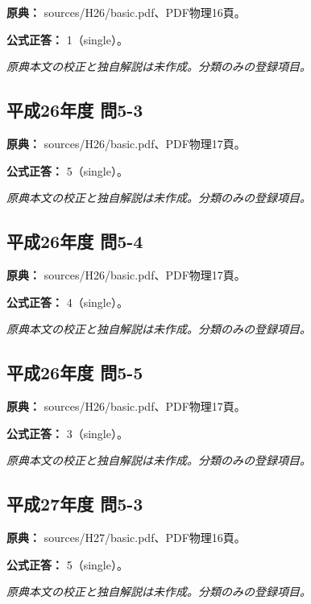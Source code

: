 \noindent\textbf{原典：} sources/H26/basic.pdf、PDF物理16頁。

\textbf{公式正答：} 1（single）。

\par\textit{原典本文の校正と独自解説は未作成。分類のみの登録項目。}

\subsection{平成26年度 問5-3}
\label{q:h26-reg-basic-5-3}

\noindent\textbf{原典：} sources/H26/basic.pdf、PDF物理17頁。

\textbf{公式正答：} 5（single）。

\par\textit{原典本文の校正と独自解説は未作成。分類のみの登録項目。}

\subsection{平成26年度 問5-4}
\label{q:h26-reg-basic-5-4}

\noindent\textbf{原典：} sources/H26/basic.pdf、PDF物理17頁。

\textbf{公式正答：} 4（single）。

\par\textit{原典本文の校正と独自解説は未作成。分類のみの登録項目。}

\subsection{平成26年度 問5-5}
\label{q:h26-reg-basic-5-5}

\noindent\textbf{原典：} sources/H26/basic.pdf、PDF物理17頁。

\textbf{公式正答：} 3（single）。

\par\textit{原典本文の校正と独自解説は未作成。分類のみの登録項目。}

\subsection{平成27年度 問5-3}
\label{q:h27-reg-basic-5-3}

\noindent\textbf{原典：} sources/H27/basic.pdf、PDF物理16頁。

\textbf{公式正答：} 5（single）。

\par\textit{原典本文の校正と独自解説は未作成。分類のみの登録項目。}

